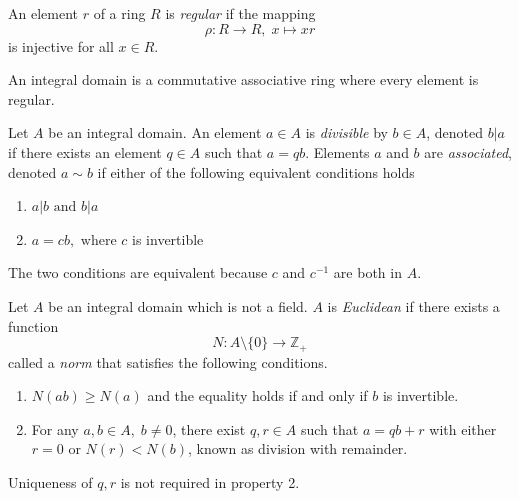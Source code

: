 \documentclass{article}
\begin{document}
      \begin{definition}
         An element $r$ of a ring $R$ is \textit{regular} if the mapping 
         \begin{equation}
           \rho: R \longrightarrow R, \; x \mapsto x r
         \end{equation}
        is injective for all $x \in R$. 
      \end{definition}

      \begin{proposition}
        An integral domain is a commutative associative ring where every element is regular. 
      \end{proposition}

      \begin{definition}
        Let $A$ be an integral domain. An element $a \in A$ is \textit{divisible} by $b \in A$, denoted $b | a$ if there exists an element $q \in A$ such that $a = q b$. Elements $a$ and $b$ are \textit{associated}, denoted $a \sim b$ if either of the following equivalent conditions holds
        \begin{enumerate}
            \item $a | b \text{ and } b | a$
            \item $a = c b, \text{ where } c$ is invertible
        \end{enumerate}
        The two conditions are equivalent because $c$ and $c^{-1}$ are both in $A$. 
      \end{definition}

      \begin{definition}
        Let $A$ be an integral domain which is not a field. $A$ is \textit{Euclidean} if there exists a function 
        \begin{equation}
          N: A \setminus \{ 0 \} \longrightarrow \mathbb{Z}_+
        \end{equation}
        called a \textit{norm} that satisfies the following conditions. 
        \begin{enumerate}
          \item $N(a b) \geq N(a)$ and the equality holds if and only if $b$ is invertible. 
          \item For any $a, b \in A, \; b \neq 0$, there exist $q, r \in A$ such that $a = q b + r$ with either $r = 0$ or $ N(r) < N(b)$, known as division with remainder. 
        \end{enumerate}
        Uniqueness of $q, r$ is not required in property 2. 
      \end{definition}
\end{document}
